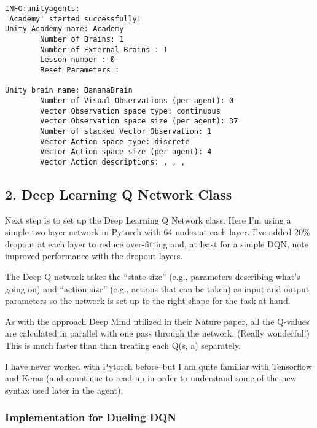 \documentclass[11pt]{article}
\begin{document}
    \begin{Verbatim}[commandchars=\\\{\}]
INFO:unityagents:
'Academy' started successfully!
Unity Academy name: Academy
        Number of Brains: 1
        Number of External Brains : 1
        Lesson number : 0
        Reset Parameters :
		
Unity brain name: BananaBrain
        Number of Visual Observations (per agent): 0
        Vector Observation space type: continuous
        Vector Observation space size (per agent): 37
        Number of stacked Vector Observation: 1
        Vector Action space type: discrete
        Vector Action space size (per agent): 4
        Vector Action descriptions: , , , 

    \end{Verbatim}

    \hypertarget{deep-learning-q-network-class}{%
\subsection{2. Deep Learning Q Network
Class}\label{deep-learning-q-network-class}}

Next step is to set up the Deep Learning Q Network class. Here I'm using
a simple two layer network in Pytorch with 64 nodes at each layer. I've
added 20\% dropout at each layer to reduce over-fitting and, at least
for a simple DQN, note improved performance with the dropout layers.

The Deep Q network takes the ``state size'' (e.g., parameters describing
what's going on) and ``action size'' (e.g., actions that can be taken)
as input and output parameters so the network is set up to the right
shape for the task at hand.

As with the approach Deep Mind utilized in their Nature paper, all the
Q-values are calculated in parallel with one pass through the network.
(Really wonderful!) This is much faster than than treating each Q(s, a)
separately.

I have never worked with Pytorch before--but I am quite familiar with
Tensorflow and Keras (and countinue to read-up in order to understand
some of the new syntax used later in the agent).

\hypertarget{implementation-for-dueling-dqn}{%
\subsubsection{Implementation for Dueling
DQN}\label{implementation-for-dueling-dqn}}
\end{document}
